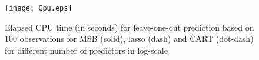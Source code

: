 \documentclass{article}
\begin{document}
	
	
%
%
%










\begin{figure}
\centering
\texttt{[image: Cpu.eps]}
\caption{Elapsed CPU time (in seconds) for leave-one-out prediction based on $100$ observations for MSB (solid), lasso (dash) and CART (dot-dash) for different number of predictors in log-scale} \label{Cpu}
\end{figure}
\end{document}
